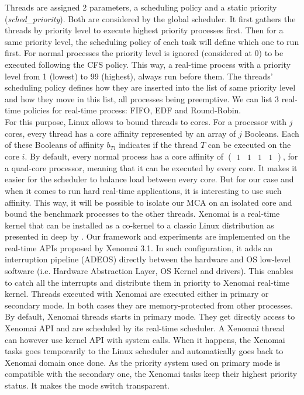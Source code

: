 \documentclass[french, a4paper, 11pt, twoside, pdftex]{StyleThese}
\begin{document}
                        Threads are assigned 2 parameters, a scheduling policy and a static priority (\textit{sched\_priority}). Both are considered by the global scheduler. It first gathers the threads by priority level to execute highest priority processes first. Then for a same priority level, the scheduling policy of each task will define which one to run first. For normal processes the priority level is ignored (considered at 0) to be executed following the CFS policy. This way, a real-time process with a priority level from 1 (lowest) to 99 (highest), always run before them. The threads' scheduling policy defines how they are inserted into the list of same priority level and how they move in this list, all processes being preemptive.  We can list 3 real-time policies for real-time process: FIFO, EDF and Round-Robin. \\
                        For this purpose, Linux allows to bound threads to cores. For a processor with $j$ cores, every thread has a core affinity represented by an array of $j$ Booleans. Each of these Booleans of affinity $b_{Ti}$ indicates if the thread $T$ can be executed on the core $i$. By default, every normal process has a core affinity of $\begin{pmatrix}1 & 1 & 1 & 1\end{pmatrix}$, for a quad-core processor, meaning that it can be executed by every core. It makes it easier for the scheduler to balance load between every core. But for our case and when it comes to run hard real-time applications, it is interesting to use such affinity. This way, it will be possible to isolate our MCA on an isolated core and bound the benchmark processes to the other threads.
                        Xenomai is a real-time kernel that can be installed as a co-kernel to a classic Linux distribution as presented in deep by \cite{gerum_xenomai_2004}. Our framework and experiments are implemented on the real-time APIs proposed by Xenomai 3.1.
                        In such configuration, it adds an interruption pipeline (ADEOS) directly between the hardware and OS low-level software (i.e. Hardware Abstraction Layer, OS Kernel and drivers). This enables to catch all the interrupts and distribute them in priority to Xenomai real-time kernel.
                        Threads executed with Xenomai are executed either in primary or secondary mode. In both cases they are memory-protected from other processes. By default, Xenomai threads starts in primary mode. They get directly access to Xenomai API and are scheduled by its real-time scheduler. A Xenomai thread can however use kernel API with system calls. When it happens, the Xenomai tasks goes temporarily to the Linux scheduler and automatically goes back to Xenomai domain once done. As the priority system used on primary mode is compatible with the secondary one, the Xenomai tasks keep their highest priority status. It makes the mode switch transparent.
            
\end{document}
